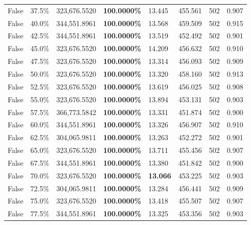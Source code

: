\begin{table}[H]
\begin{tabular}{lllrllll}
\cline{1-8}
False & 37.5\% & 323,676.5520 & \bfseries \color{red} 100.0000\% & 13.445 & 455.561 & 502 & 0.907 \\
\cline{1-8}
False & 40.0\% & 344,551.8961 & \bfseries \color{red} 100.0000\% & 13.568 & 459.509 & 502 & 0.915 \\
\cline{1-8}
False & 42.5\% & 344,551.8961 & \bfseries \color{red} 100.0000\% & 13.519 & 452.492 & 502 & 0.901 \\
\cline{1-8}
False & 45.0\% & 323,676.5520 & \bfseries \color{red} 100.0000\% & 14.209 & 456.632 & 502 & 0.910 \\
\cline{1-8}
False & 47.5\% & 323,676.5520 & \bfseries \color{red} 100.0000\% & 13.314 & 456.093 & 502 & 0.909 \\
\cline{1-8}
False & 50.0\% & 323,676.5520 & \bfseries \color{red} 100.0000\% & 13.320 & 458.160 & 502 & 0.913 \\
\cline{1-8}
False & 52.5\% & 323,676.5520 & \bfseries \color{red} 100.0000\% & 13.619 & 456.025 & 502 & 0.908 \\
\cline{1-8}
False & 55.0\% & 323,676.5520 & \bfseries \color{red} 100.0000\% & 13.894 & 453.131 & 502 & 0.903 \\
\cline{1-8}
False & 57.5\% & 366,773.5842 & \bfseries \color{red} 100.0000\% & 13.331 & 451.874 & 502 & 0.900 \\
\cline{1-8}
False & 60.0\% & 344,551.8961 & \bfseries \color{red} 100.0000\% & 13.326 & 456.907 & 502 & 0.910 \\
\cline{1-8}
False & 62.5\% & \color{red} 304,065.9811 & \bfseries \color{red} 100.0000\% & 13.263 & 452.272 & 502 & 0.901 \\
\cline{1-8}
False & 65.0\% & 323,676.5520 & \bfseries \color{red} 100.0000\% & 13.711 & 455.456 & 502 & 0.907 \\
\cline{1-8}
False & 67.5\% & 344,551.8961 & \bfseries \color{red} 100.0000\% & 13.380 & 451.842 & 502 & 0.900 \\
\cline{1-8}
False & 70.0\% & 323,676.5520 & \bfseries \color{red} 100.0000\% & \bfseries \color{red} 13.066 & 453.225 & 502 & 0.903 \\
\cline{1-8}
False & 72.5\% & \color{red} 304,065.9811 & \bfseries \color{red} 100.0000\% & 13.284 & 456.441 & 502 & 0.909 \\
\cline{1-8}
False & 75.0\% & 323,676.5520 & \bfseries \color{red} 100.0000\% & 13.418 & 455.507 & 502 & 0.907 \\
\cline{1-8}
False & 77.5\% & 344,551.8961 & \bfseries \color{red} 100.0000\% & 13.325 & 453.356 & 502 & 0.903 \\

\end{tabular}
\end{table}
